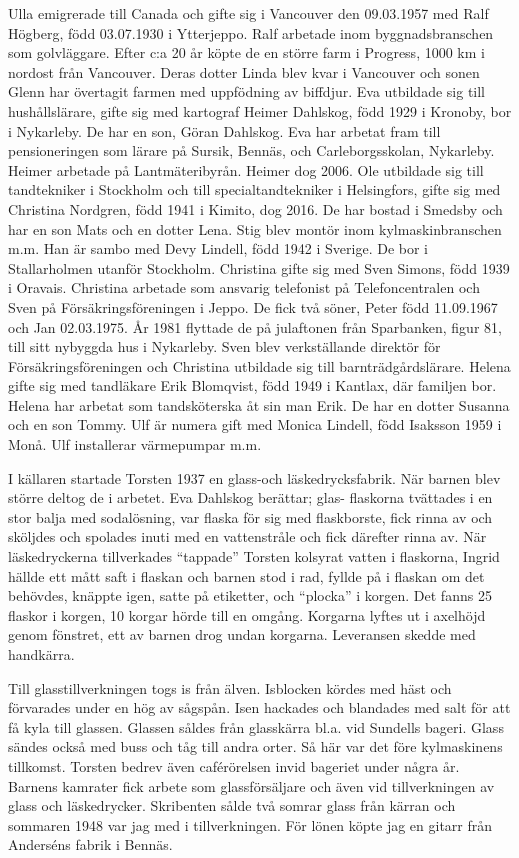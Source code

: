 Ulla emigrerade till Canada och gifte sig i Vancouver den 09.03.1957 med	Ralf Högberg, född 03.07.1930 i Ytterjeppo. Ralf arbetade inom 	byggnadsbranschen som golvläggare. Efter c:a 20 år köpte de en större	farm i Progress, 1000 km i nordost från Vancouver. Deras dotter Linda blev kvar i Vancouver och sonen Glenn har övertagit farmen med 	uppfödning av biffdjur.
Eva utbildade sig till hushållslärare, gifte sig med kartograf Heimer Dahlskog, född 1929 i Kronoby, bor i Nykarleby. De har en son, Göran Dahlskog. Eva har arbetat fram till pensioneringen som lärare på Sursik, Bennäs, och Carleborgsskolan, Nykarleby. Heimer arbetade på Lantmäteribyrån. Heimer dog 2006.
Ole utbildade sig till 	tandtekniker i Stockholm och till specialtandtekniker i Helsingfors, gifte sig med Christina Nordgren, född 1941 i Kimito, dog 2016. De har bostad i Smedsby och har en son Mats och en dotter Lena.
Stig blev montör inom kylmaskinbranschen m.m. Han är sambo med Devy Lindell, född 1942 i 	Sverige. De bor i Stallarholmen utanför Stockholm.
Christina gifte sig 	med Sven Simons, född 1939 i Oravais. Christina arbetade som ansvarig telefonist på Telefoncentralen och Sven på Försäkringsföreningen i Jeppo. De fick två söner, Peter född 11.09.1967 och Jan 02.03.1975.  År 1981 flyttade de på julaftonen från Sparbanken, figur 81, till sitt 	nybyggda hus i Nykarleby. Sven blev verkställande direktör för 	Försäkringsföreningen och Christina utbildade sig till barnträdgårdslärare.
Helena gifte sig med tandläkare Erik Blomqvist, född 1949 i Kantlax, där familjen bor. Helena har arbetat som tandsköterska åt sin man Erik. De 	har en dotter Susanna och en son Tommy.
Ulf är numera gift med Monica Lindell, född Isaksson 1959 i Monå. Ulf installerar värmepumpar 	m.m.

I källaren startade Torsten 1937 en glass-och läskedrycksfabrik. När barnen blev större deltog de i arbetet. Eva Dahlskog berättar; glas-	flaskorna tvättades i en stor balja med sodalösning, var flaska för sig med flaskborste, fick rinna av och sköljdes och spolades inuti med en vattenstråle och fick därefter rinna av. När läskedryckerna tillverkades ``tappade'' Torsten kolsyrat vatten i flaskorna, Ingrid hällde ett mått saft i flaskan och barnen stod i rad, fyllde på i flaskan om det behövdes,	knäppte igen, satte på etiketter, och ``plocka'' i korgen. Det fanns 25 flaskor i korgen, 10 korgar hörde till en omgång. Korgarna lyftes ut i axelhöjd genom fönstret, ett av barnen drog undan korgarna. Leveransen 	skedde med handkärra.

Till glasstillverkningen togs is från älven. Isblocken kördes med häst och förvarades under en hög av sågspån. Isen hackades och blandades 	med salt för att få kyla till glassen. Glassen såldes från glasskärra bl.a. vid Sundells bageri. Glass sändes också med buss och tåg till andra orter. Så här var det före kylmaskinens tillkomst. Torsten bedrev även caférörelsen invid bageriet under några år. Barnens kamrater fick arbete som glassförsäljare och även vid tillverkningen av glass och läskedrycker. Skribenten sålde två somrar glass från kärran och sommaren 1948 var jag med i tillverkningen. För lönen köpte jag en gitarr från Anderséns fabrik i Bennäs.

